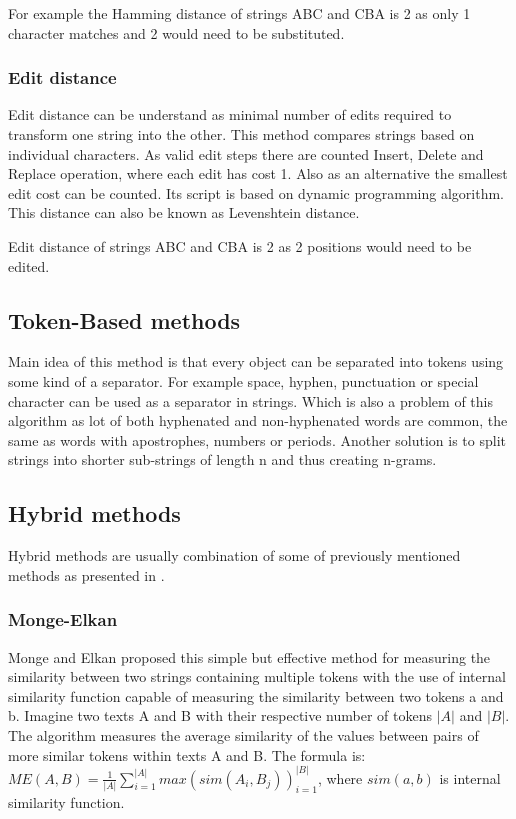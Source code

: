 For example the Hamming distance of strings ABC and CBA is 2 as only 1 character matches and 2 would need to be substituted.

\subsubsection{Edit distance}
Edit distance can be understand as minimal number of edits required to transform one string into the other. This method compares strings based on individual characters. As valid edit steps there are counted Insert, Delete and Replace operation, where each edit has cost 1. Also as an alternative the smallest edit cost can be counted. Its script is based on dynamic programming algorithm. This distance can also be known as Levenshtein distance. \cite{editDist}

Edit distance of strings ABC and CBA is 2 as 2 positions would need to be edited.
\subsection{Token-Based methods}
Main idea of this method is that every object can be separated into tokens using some kind of a separator. For example space, hyphen, punctuation or special character can be used as a separator in strings. Which is also a problem of this algorithm as lot of both hyphenated and non-hyphenated words are common, the same as words with apostrophes, numbers or periods. Another solution is to split strings into shorter sub-strings of length n and thus creating n-grams. \cite{tokenDist}

\subsection{Hybrid methods}
Hybrid methods are usually combination of some of previously mentioned methods as presented in \cite{hybrmeasure}.

\subsubsection{Monge-Elkan}
Monge and Elkan proposed this simple but effective method for measuring the similarity between two strings containing multiple tokens with the use of internal similarity function capable of measuring the similarity between two tokens a and b. 
Imagine two texts A and B with their respective number of tokens $\lvert A \rvert$ and $\lvert B\rvert$. 
The algorithm measures the average similarity of the values between pairs of more similar tokens within texts A and B. 
The formula is: 
$ME(A,B)=\frac{1}{\lvert A \rvert} \sum_{i=1}^{\lvert A \rvert} max (sim(A_i, B_j))_{i=1}^{\lvert B\rvert}$, where $sim(a, b)$ is internal similarity function.
